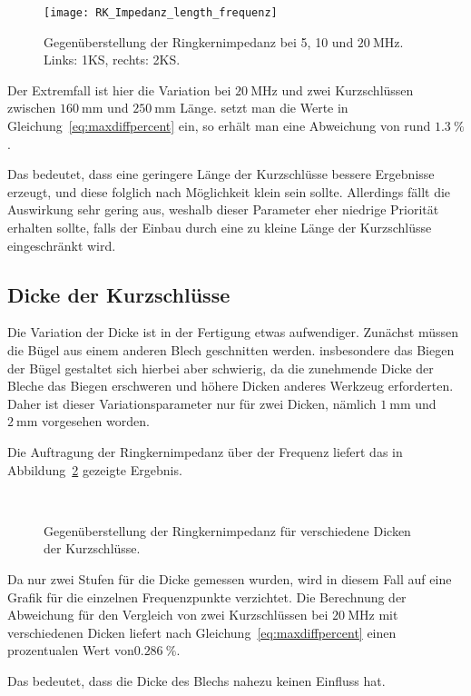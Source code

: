 \begin{figure}[htb]
	\centering
	\texttt{[image: RK\_Impedanz\_length\_frequenz]}
	\caption{Gegen\"uberstellung der Ringkernimpedanz bei 5, 10 und $\SI{20}{\mega\hertz}$. Links: 1KS, rechts: 2KS.}
	\label{fig:ringcoreheight20}
\end{figure}
\par
Der Extremfall ist hier die Variation bei $\SI{20}{\mega\hertz}$ und zwei Kurzschl\"ussen zwischen $\SI{160}{\milli\meter}$ und $\SI{250}{\milli\meter}$ L\"ange. setzt man die Werte in Gleichung~\ref{eq:maxdiffpercent} ein, so erh\"alt man eine Abweichung von rund $\SI{1,3}{\%}$. 
\par
Das bedeutet, dass eine geringere L\"ange der Kurzschl\"usse bessere Ergebnisse erzeugt, und diese folglich nach M\"oglichkeit klein sein sollte. Allerdings f\"allt die Auswirkung sehr gering aus, weshalb dieser Parameter eher niedrige Priorit\"at erhalten sollte, falls der Einbau durch eine zu kleine L\"ange der Kurzschl\"usse eingeschr\"ankt wird.

\subsection{Dicke der Kurzschl\"usse}
Die Variation der Dicke ist in der Fertigung etwas aufwendiger. Zun\"achst m\"ussen die B\"ugel aus einem anderen Blech geschnitten werden. insbesondere das Biegen der B\"ugel gestaltet sich hierbei aber schwierig, da die zunehmende Dicke der Bleche das Biegen erschweren und h\"ohere Dicken anderes Werkzeug erforderten. Daher ist dieser Variationsparameter nur f\"ur zwei Dicken, n\"amlich $\SI{1}{\milli\meter}$ und $\SI{2}{\milli\meter}$ vorgesehen worden.
\par
Die Auftragung der Ringkernimpedanz \"uber der Frequenz liefert das in Abbildung~\ref{fig:ringcorethick} gezeigte Ergebnis.



\newpage




\begin{figure}[htb]
	\centering
	\\
	\caption{Gegen\"uberstellung der Ringkernimpedanz f\"ur verschiedene Dicken der Kurzschl\"usse.}
	\label{fig:ringcorethick}
\end{figure}
\par
Da nur zwei Stufen f\"ur die Dicke gemessen wurden, wird in diesem Fall auf eine Grafik f\"ur die einzelnen Frequenzpunkte verzichtet. Die Berechnung der Abweichung f\"ur den Vergleich von zwei Kurzschl\"ussen bei $\SI{20}{\mega\hertz}$ mit verschiedenen Dicken liefert nach Gleichung~\ref{eq:maxdiffpercent} einen prozentualen Wert von$\SI{0,286}{\%}$. 
\par
Das bedeutet, dass die Dicke des Blechs nahezu keinen Einfluss hat.



\newpage